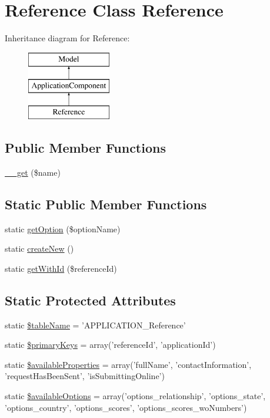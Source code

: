 \hypertarget{class_reference}{\section{Reference Class Reference}
\label{class_reference}
}
Inheritance diagram for Reference\-:\begin{figure}[H]
\begin{center}
\leavevmode
\includegraphics[height=3.000000cm]{class_reference}
\end{center}
\end{figure}
\subsection*{Public Member Functions}
\begin{DoxyCompactItemize}
\item 
\hyperlink{class_reference_a6ead7621a834272a3795e909e54fa92c}{\-\_\-\-\_\-get} (\$name)
\end{DoxyCompactItemize}
\subsection*{Static Public Member Functions}
\begin{DoxyCompactItemize}
\item 
static \hyperlink{class_reference_a416ab5ebf18b464c5abbc5f59c5e28be}{get\-Option} (\$option\-Name)
\item 
static \hyperlink{class_reference_a7155341888ecef15f7250e9a56088eff}{create\-New} ()
\item 
static \hyperlink{class_reference_a7333d87aea1dd954a87f050f06bbe4eb}{get\-With\-Id} (\$reference\-Id)
\end{DoxyCompactItemize}
\subsection*{Static Protected Attributes}
\begin{DoxyCompactItemize}
\item 
static \hyperlink{class_reference_ac0ffc7c20c20f31a011368f038760024}{\$table\-Name} = 'A\-P\-P\-L\-I\-C\-A\-T\-I\-O\-N\-\_\-\-Reference'
\item 
static \hyperlink{class_reference_a69cd6612c8fbcb2bca4b1bc051da7bbf}{\$primary\-Keys} = array('reference\-Id', 'application\-Id')
\item 
static \hyperlink{class_reference_a7a370b1168e05218ff74b2d87236d7d1}{\$available\-Properties} = array('full\-Name', 'contact\-Information', 'request\-Has\-Been\-Sent', 'is\-Submitting\-Online')
\item 
static \hyperlink{class_reference_a1fec98563c94a5fe7692c5781bffe8f0}{\$available\-Options} = array('options\-\_\-relationship', 'options\-\_\-state', 'options\-\_\-country', 'options\-\_\-scores', 'options\-\_\-scores\-\_\-wo\-Numbers')
\end{DoxyCompactItemize}
